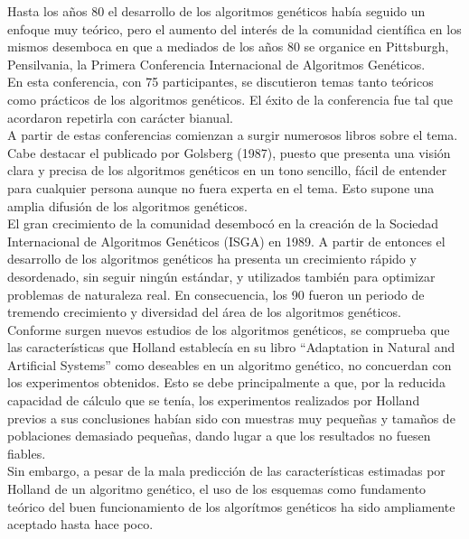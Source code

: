 \documentclass[12pt]{article} \usepackage[utf8x]{inputenc}
\begin{document}
 Hasta los años 80 el desarrollo de los algoritmos genéticos
había seguido un enfoque muy teórico, pero el aumento del interés de la comunidad científica 
en los mismos desemboca en que a mediados de los años 80  se organice
en Pittsburgh, Pensilvania, la Primera Conferencia Internacional de Algoritmos Genéticos.\\

En esta conferencia, con 75 participantes, se discutieron temas tanto teóricos como prácticos
de los algoritmos genéticos. El éxito de la conferencia fue tal que acordaron repetirla con 
carácter bianual.\\

A partir de estas conferencias comienzan a surgir numerosos libros sobre el tema. Cabe destacar
el publicado por Golsberg (1987), puesto que presenta una visión clara y precisa de los algoritmos
genéticos en un tono sencillo, fácil de entender para cualquier persona aunque no fuera experta
en el tema. Esto supone una amplia 
difusión de los algoritmos genéticos.\\

El gran crecimiento de la comunidad desembocó en la creación de la Sociedad Internacional de 
Algoritmos Genéticos (ISGA) en 1989. A partir de entonces el desarrollo de los algoritmos 
genéticos ha presenta un crecimiento rápido y desordenado, sin seguir ningún estándar, y utilizados
también para optimizar problemas de naturaleza real. En consecuencia, los 90 fueron un periodo de tremendo
crecimiento y diversidad del área de los algoritmos genéticos. \\


Conforme surgen nuevos estudios de los algoritmos genéticos, se comprueba que las características
que Holland establecía en su libro ``Adaptation in Natural and Artificial Systems'' como deseables
en un algoritmo genético, no concuerdan con los experimentos obtenidos. Esto se debe principalmente
a que, por la reducida capacidad de cálculo que se tenía, los experimentos realizados por Holland
previos a sus conclusiones habían sido con muestras muy pequeñas y tamaños de poblaciones demasiado
pequeñas, dando lugar a que los resultados no fuesen fiables. \\

Sin embargo, a pesar de la mala predicción de las características estimadas por Holland de un 
algoritmo genético, el uso de los esquemas como fundamento teórico del buen funcionamiento de los
algorítmos genéticos ha sido ampliamente aceptado hasta hace poco.\\
\end{document}
